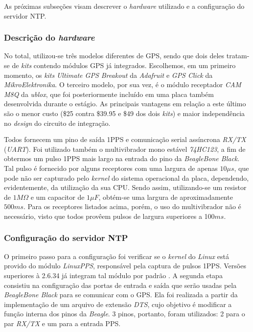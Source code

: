 \vspace{12pt}

As próximas subseções visam descrever o \textit{hardware} utilizado e a
configuração do servidor NTP.

\subsubsection{Descrição do \textit{hardware}}

No total, utilizou-se três modelos diferentes de GPS, sendo que dois deles
tratam-se de \textit{kits} contendo módulos GPS já integrados. Escolhemos, em um
primeiro momento, os \textit{kits} \textit{Ultimate GPS Breakout} da
\textit{Adafruit} e \textit{GPS Click} da \textit{MikroElektronika}. O terceiro
modelo, por sua vez, é o módulo receptador \textit{CAM M8Q} da \textit{ublox},
que foi posteriormente incluído em uma placa também desenvolvida durante o
estágio. As principais vantagens em relação a este último são o menor custo
(\$25 contra \$39.95 e \$49 dos dois \textit{kits}) e maior independência
no \textit{design} do circuito de integração.

\vspace{12pt}

Todos fornecem um pino de saída 1PPS e comunicação serial assíncrona
\textit{RX/TX} (\textit{UART}). Foi utilizado também o multivibrador mono
estável \textit{74HC123}, a fim de obtermos um pulso 1PPS mais largo na entrada
do pino da \textit{BeagleBone Black}. Tal pulso é fornecido por alguns
receptores com uma largura de apenas \(10\mu s\), que pode não ser capturado
pelo \textit{kernel} do sistema operacional da placa, dependendo, evidentemente,
da utilização da sua CPU. Sendo assim, utilizando-se um resistor de \(1M\Omega\)
e um capacitor de \(1\mu F\), obtém-se uma largura de aproximadamente \(500
ms\). Para os receptores listados acima, porém, o uso do multivibrador não é
necessário, visto que todos provêem pulsos de largura superiores a 100\(ms\).

\subsubsection{Configuração do servidor NTP}

O primeiro passo para a configuração foi verificar se o \textit{kernel} do
\textit{Linux} está provido do módulo \textit{LinuxPPS}, responsável pela
captura de pulsos 1PPS. Versões superiores à 2.6.34 já integram tal módulo por
padrão \cite{linuxpps}. A segunda etapa consistiu na configuração das portas de
entrada e saída que serão usadas pela \textit{BeagleBone Black} para se comunicar com o
GPS. Ela foi realizada a partir da implementação de um arquivo de extensão
\textit{DTS}, cujo objetivo é modificar a função interna dos pinos da
\textit{Beagle}. 3 pinos, portanto, foram utilizados: 2 para o par
\textit{RX/TX} e um para a entrada PPS. 

